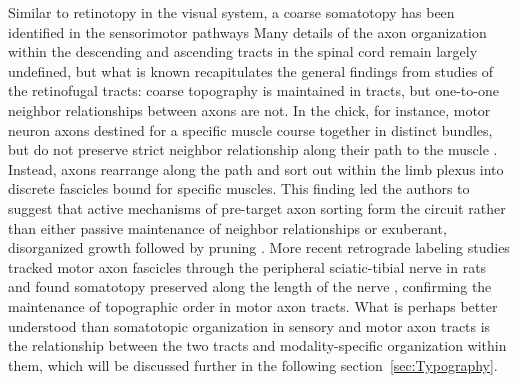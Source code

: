 Similar to retinotopy in the visual system, a coarse somatotopy has been identified in the sensorimotor pathways \cite{barnard1956study,milner1998selective,maslany1991somatotopic}
Many details of the axon organization within the descending and ascending tracts in the spinal cord remain largely undefined, but what is known recapitulates the general findings from studies of the retinofugal tracts: coarse topography is maintained in tracts, but one-to-one neighbor relationships between axons are not.
In the chick, for instance, motor neuron axons destined for a specific muscle course together in distinct bundles, but do not preserve strict neighbor relationship along their path to the muscle \cite{lance1981pathway}. 
Instead, axons rearrange along the path and sort out within the limb plexus into discrete fascicles bound for specific muscles. 
This finding led the authors to suggest that active mechanisms of pre-target axon sorting form the circuit rather than either passive maintenance of neighbor relationships or exuberant, disorganized growth followed by pruning \cite{lance1981pathway}. %
More recent retrograde labeling studies tracked motor axon fascicles through the peripheral sciatic-tibial nerve in rats and found somatotopy preserved along the length of the nerve \cite{badia2010topographical}, confirming the maintenance of topographic order in motor axon tracts. 
What is perhaps better understood than somatotopic organization in sensory and motor axon tracts is the relationship between the two tracts and modality-specific organization within them, which will be discussed further in the following section~\ref{sec:Typography}.

